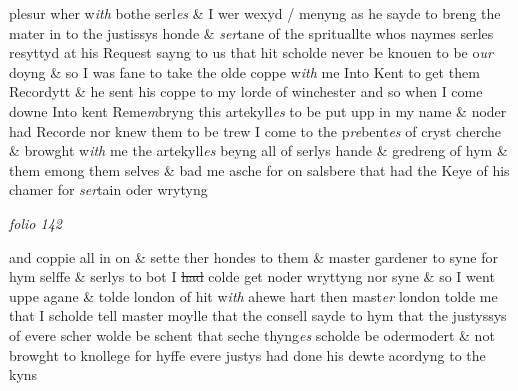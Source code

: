 \documentclass[12pt, a4paper]{book}
\begin{document}
            				 plesur wher w\textit{ith }bothe serl\textit{es} \& I wer wexyd / menyng as he sayde to breng
  the mater in to the justissys honde \& \textit{ser}tane of the sprituallte whos naymes
 serles resyttyd at his Request sayng to us that hit scholde never be knouen
 to be o\textit{ur} doyng \& so I was fane to take the olde coppe w\textit{ith} me Into Kent
            				to get them Recordytt \& he sent his coppe to my lorde of winchester
  and so when I come downe Into kent Reme\textit{m}bryng this artekyll\textit{es} to be put
 upp in my name \& noder had Recorde nor knew them to be trew I
 come to the p\textit{re}bent\textit{es} of cryst cherche \& browght w\textit{ith} me the artekyll\textit{es} beyng
            				all of serlys hande \& gredreng of hym \& them emong them selves \& bad
  me asche for on salsbere that had the Keye of his chamer for \textit{ser}tain oder wrytyng

\dotfill
						\newpage
{}

\textit{folio 142}


 	
 		
				\marginpar[\vspace{0.5cm}{\textcolor{Gray}{n}}]{}
			
 		
				\marginpar[\vspace{0.5cm}{\textcolor{Gray}{Moyle}}]{}
			
		
		\ifthenelse{\isodd{\thepage}}
		{\reversemarginpar}
		{\normalmarginpar}
		and coppie all in on \& sette ther hondes to them \& master gardener to syne for
		 	 hym selffe \& serlys to bot I \sout{had}  colde get
			 noder wryttyng nor syne \& so I went uppe agane
			\& tolde london of hit w\textit{ith} ahewe hart then mast\textit{er} london tolde me that I scholde
			tell master moylle that the consell sayde to hym that the justyssys of evere
		 scher wolde be schent that seche thyng\textit{es} scholde be odermodert \& not browght
			to knollege for hyffe evere justys had done his dewte acordyng to the kyns
 	
 		
			
 		
				\marginpar[\vspace{0.5cm}{\textcolor{Gray}{Moyle}}]{}
			
 		
				\marginpar[\vspace{0.5cm}{\textcolor{Gray}{n}}]{}
			
\end{document}
